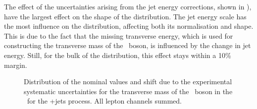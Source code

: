 The effect of the uncertainties arising from the jet energy corrections, shown in ),  have the largest effect on the shape of the distribution. The jet energy scale has the most influence on the distribution, affecting both its normalisation and shape. This is due to the fact that the missing transverse energy, which is used for constructing the transverse mass of the \PW\ boson, is influenced by the change in jet energy. Still, for the bulk of the distribution, this effect stays within a 10\% margin.
\begin{figure}[htbp] 
	\centering 
	\caption{Distribution of the nominal values and shift due to the experimental systematic uncertainties for the transverse mass of the \PW\ boson in the \WZCR\ for the \WZ+jets process. All lepton channels summed.}
	\label{fig:shiftMTW3}
\end{figure}

